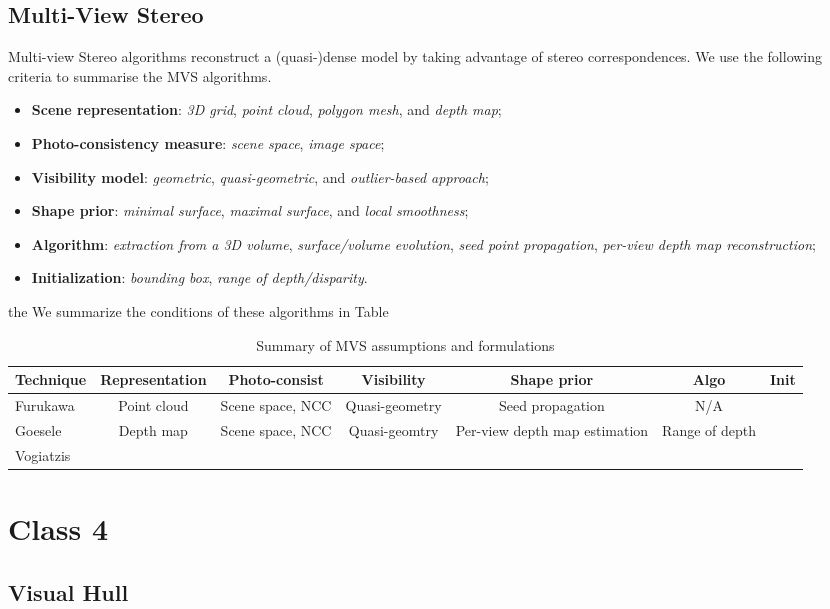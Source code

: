 \subsection{Multi-View Stereo}
Multi-view Stereo algorithms reconstruct a (quasi-)dense model by taking advantage of stereo correspondences. We use the following criteria to summarise the MVS algorithms.
\begin{itemize}
\item \textbf{Scene representation}: \textit{3D grid}, \textit{point cloud}, \textit{polygon mesh}, and \textit{depth map};
\item \textbf{Photo-consistency measure}: \textit{scene space}, \textit{image space};
\item \textbf{Visibility model}: \textit{geometric}, \textit{quasi-geometric}, and \textit{outlier-based approach};
\item \textbf{Shape prior}: \textit{minimal surface}, \textit{maximal surface}, and \textit{local smoothness};
\item \textbf{Algorithm}: \textit{extraction from a 3D volume}, \textit{surface/volume evolution}, \textit{seed point propagation}, \textit{per-view depth map reconstruction};
\item \textbf{Initialization}: \textit{bounding box}, \textit{range of depth/disparity}.
\end{itemize}
the We summarize the conditions of these algorithms in Table~
\begin{table}[h]
  \centering
  \begin{tabular}{l*{6}{c}}
  \hline
  \textbf{Technique} & Representation & Photo-consist & Visibility & Shape prior & Algo & Init\\
  \hline
  Furukawa~\cite{furukawa2010accurate} & Point cloud & Scene space, NCC & Quasi-geometry & Seed propagation & N/A\\
  Goesele~\cite{goesele2006multi} & Depth map & Scene space, NCC & Quasi-geomtry & Per-view depth map estimation & Range of depth\\
  Vogiatzis~\cite{vogiatzis2007multiview} \\
  \hline
  \end{tabular}
  \caption{Summary of MVS assumptions and formulations}
  \label{tab:class_3}
\end{table}

\section{Class 4}
\subsection{Visual Hull}

